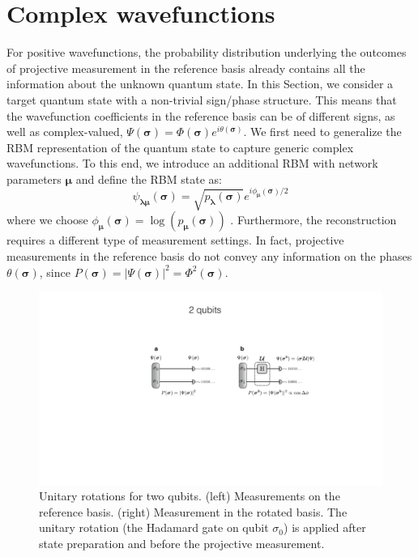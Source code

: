 \documentclass[submission, Phys, hidelnks]{SciPost}
\begin{document}
\section{Complex wavefunctions}
\label{sec:complex}
For positive wavefunctions, the probability distribution underlying the outcomes of projective measurement in the reference basis already contains all the information about the unknown quantum state. In this Section, we consider a target quantum state with a non-trivial sign/phase structure. This means that the wavefunction coefficients in the reference basis can be of different signs, as well as complex-valued, $\Psi(\bm{\sigma})=\Phi(\bm{\sigma})e^{i\theta(\bm{\sigma})}$. We first need to generalize the RBM representation of the quantum state to capture generic complex wavefunctions. To this end, we introduce an additional RBM with network parameters $\bm{\mu}$ and define the RBM state as:
\begin{equation}
    \psi_{\bm{\lambda} \bm{\mu}} (\bm{\sigma})= \sqrt{p_{\bm{\lambda}} (\bm{\sigma})} e^{i \phi_{\bm{\mu}} (\bm{\sigma})/2}
\end{equation}
where we choose $\phi_{\bm{\mu}}(\bm{\sigma}) = \log (p_{\bm{\mu}} (\bm{\sigma}))$ \cite{torlai2018tomography}. Furthermore, the reconstruction requires a different type of measurement settings. In fact, projective measurements in the reference basis do not convey any information on the phases $\theta(\bm{\sigma})$, since $P(\bm{\sigma})=|\Psi(\bm{\sigma})|^2=\Phi^2(\bm{\sigma})$.

\begin{figure}[htb]
    \centering
    \includegraphics[width=\columnwidth, trim={0 0 0 40}, clip]{plots/2qubits_rotation}
    \caption{Unitary rotations for two qubits. (left) Measurements on the reference basis. (right) Measurement in the rotated basis. The unitary rotation (the Hadamard gate on qubit $\sigma_0$) is applied after state preparation and before the projective measurement.}
    \label{phase_learn} 
\end{figure}
\end{document}
